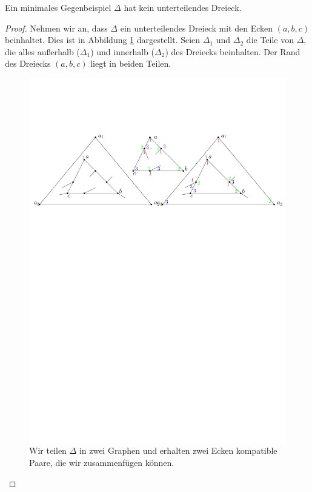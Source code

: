 \begin{lemma}\label{lem2}
Ein minimales Gegenbeispiel $\Delta$ hat kein unterteilendes Dreieck.
\end{lemma}

\begin{proof}
Nehmen wir an, dass $\Delta$ ein unterteilendes Dreieck mit den Ecken $(a,b,c)$ beinhaltet. Dies ist in Abbildung \ref{lem2} dargestellt. Seien $\Delta_1$ und $\Delta_2$ die Teile von $\Delta$, die alles außerhalb ($\Delta_1$) und innerhalb ($\Delta_2$) des Dreiecks beinhalten. Der Rand des Dreiecks $(a,b,c)$ liegt in beiden Teilen.

\begin{figure}
\centering
\includegraphics[width=1\textwidth]{lem2.pdf}
\caption{Wir teilen $\Delta$ in zwei Graphen und erhalten zwei Ecken kompatible Paare, die wir zusammenfügen können.}
\label{lem2}
\centering
\end{figure}


\end{proof}

